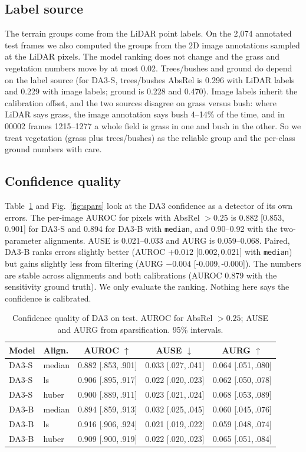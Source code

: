 \documentclass[conference]{IEEEtran}
\newcommand{\ci}[2]{{\scriptsize[#1,\,#2]}}
\newcommand{\absrel}{AbsRel}
\begin{document}
\subsection{Label source}\label{sec:labels}
The terrain groups come from the LiDAR point labels. On the 2{,}074 annotated test frames we also computed the groups from the 2D image annotations sampled at the LiDAR pixels. The model ranking does not change and the grass and vegetation numbers move by at most 0.02. Trees/bushes and ground do depend on the label source (for DA3-S, trees/bushes \absrel{} is 0.296 with LiDAR labels and 0.229 with image labels; ground is 0.228 and 0.470). Image labels inherit the calibration offset, and the two sources disagree on grass versus bush: where LiDAR says grass, the image annotation says bush 4--14\% of the time, and in 00002 frames 1215--1277 a whole field is grass in one and bush in the other. So we treat vegetation (grass plus trees/bushes) as the reliable group and the per-class ground numbers with care.

\subsection{Confidence quality}\label{sec:conf}
Table~\ref{tab:conf} and Fig.~\ref{fig:spars} look at the DA3 confidence as a detector of its own errors. The per-image AUROC for pixels with \absrel{} $>0.25$ is 0.882 \ci{0.853}{0.901} for DA3-S and 0.894 for DA3-B with \texttt{median}, and 0.90--0.92 with the two-parameter alignments. AUSE is 0.021--0.033 and AURG is 0.059--0.068. Paired, DA3-B ranks errors slightly better (AUROC $+0.012$ \ci{0.002}{0.021} with \texttt{median}) but gains slightly less from filtering (AURG $-0.004$ \ci{-0.009}{-0.000}). The numbers are stable across alignments and both calibrations (AUROC 0.879 with the sensitivity ground truth). We only evaluate the ranking. Nothing here says the confidence is calibrated.

\begin{table}[!t]
\caption{Confidence quality of DA3 on test. AUROC for \absrel{} $>0.25$; AUSE and AURG from sparsification. 95\% intervals.}
\label{tab:conf}
\centering
\footnotesize
\setlength{\tabcolsep}{3pt}
\begin{tabular}{llccc}
\toprule
Model & Align. & AUROC $\uparrow$ & AUSE $\downarrow$ & AURG $\uparrow$ \\
\midrule
DA3-S & median & 0.882 \ci{.853}{.901} & 0.033 \ci{.027}{.041} & 0.064 \ci{.051}{.080} \\
DA3-S & ls     & 0.906 \ci{.895}{.917} & 0.022 \ci{.020}{.023} & 0.062 \ci{.050}{.078} \\
DA3-S & huber  & 0.900 \ci{.889}{.911} & 0.023 \ci{.021}{.024} & 0.068 \ci{.053}{.089} \\
DA3-B & median & 0.894 \ci{.859}{.913} & 0.032 \ci{.025}{.045} & 0.060 \ci{.045}{.076} \\
DA3-B & ls     & 0.916 \ci{.906}{.924} & 0.021 \ci{.019}{.022} & 0.059 \ci{.048}{.074} \\
DA3-B & huber  & 0.909 \ci{.900}{.919} & 0.022 \ci{.020}{.023} & 0.065 \ci{.051}{.084} \\
\bottomrule
\end{tabular}
\end{table}
\end{document}
